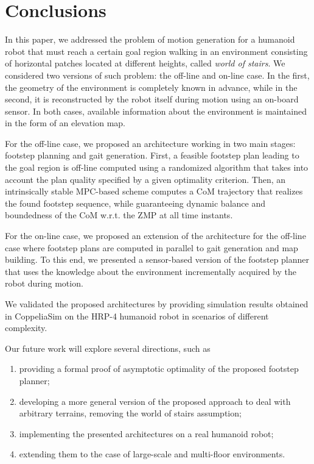 \section{Conclusions} 
\label{sec:Conclusions}


In this paper, we addressed the problem of motion generation for a humanoid robot that must reach a certain goal region walking in an environment consisting of horizontal patches located at different heights, called \textit{world of stairs}.
We considered two versions of such problem: the off-line and on-line case. 
In the first, the geometry of the environment is completely known in advance, while in the second, it is reconstructed by the robot itself during motion using an on-board sensor. In both cases, available information about the environment is maintained in the form of an elevation map. 

For the off-line case, we proposed an architecture working in two main stages: footstep planning and gait generation.
First, a feasible footstep plan leading to the goal region is off-line computed using a randomized algorithm that takes into account the plan quality specified by a given optimality criterion.
Then, an intrinsically stable MPC-based scheme computes a CoM trajectory that realizes the found footstep sequence, while guaranteeing dynamic balance and boundedness of the CoM w.r.t. the ZMP at all time instants.

For the on-line case, we proposed an extension of the architecture for the off-line case where footstep plans are computed in parallel to gait generation and map building.
To this end, we presented a sensor-based version of the footstep planner that uses the knowledge about the environment incrementally acquired by the robot during motion.

We validated  the proposed architectures by providing simulation results obtained in CoppeliaSim on the HRP-4 humanoid robot in scenarios of different complexity.

Our future work will explore several directions, such as
\begin{enumerate}
    \item providing a formal proof of asymptotic optimality of the proposed footstep planner;
    \item developing a more general version of the proposed approach to deal with arbitrary terrains, removing the world of stairs assumption;
    \item implementing the presented architectures on a real humanoid robot;
    \item extending them to the case of large-scale and multi-floor environments.
\end{enumerate}

